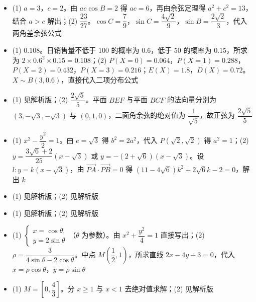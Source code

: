 \begin{itemize}[leftmargin=2.6em]
  \item[\textbf{17.}] (1) $a=3$，$c=2$。由 $ac\cos B=2$ 得 $ac=6$，再由余弦定理得 $a^2+c^2=13$，结合 $a>c$ 解出；(2) $\dfrac{23}{27}$。$\cos C=\dfrac79$，$\sin C=\dfrac{4\sqrt2}9$，$\sin B=\dfrac{2\sqrt2}3$，代入两角差余弦公式
  \item[\textbf{18.}] (1) $0.108$。日销售量不低于 $100$ 的概率为 $0.6$，低于 $50$ 的概率为 $0.15$，所求为 $2\times0.6^2\times0.15=0.108$；(2) $P(X=0)=0.064$，$P(X=1)=0.288$，$P(X=2)=0.432$，$P(X=3)=0.216$；$E(X)=1.8$，$D(X)=0.72$。$X\sim B(3,0.6)$，直接代入二项分布公式
  \item[\textbf{19.}] (1) 见解析版；(2) $\dfrac{2\sqrt5}5$。平面 $BEF$ 与平面 $BCF$ 的法向量分别为 $(3,-\sqrt3,-\sqrt3)$ 与 $(0,1,0)$，二面角余弦的绝对值为 $\dfrac1{\sqrt5}$，故正弦为 $\dfrac{2\sqrt5}5$
  \item[\textbf{20.}] (1) $x^2-\dfrac{y^2}2=1$。由 $e=\sqrt3$ 得 $b^2=2a^2$，代入 $P(\sqrt2,\sqrt2)$ 得 $a^2=1$；(2) $y=\dfrac{3\sqrt6+2}{25}(x-\sqrt3)$ 或 $y=-(2+\sqrt6)(x-\sqrt3)$。设 $l:y=k(x-\sqrt3)$，由 $\overrightarrow{PA}\cdot\overrightarrow{PB}=0$ 得 $(11-4\sqrt6)k^2+2\sqrt6k-2=0$，解出 $k$
  \item[\textbf{21.}] (1) 见解析版；(2) 见解析版
\end{itemize}

\begin{itemize}[leftmargin=2.6em]
  \item[\textbf{22.}] (1) 见解析版；(2) 见解析版
  \item[\textbf{23.}] (1) $\begin{cases}x=\cos\theta,\\y=2\sin\theta\end{cases}$（$\theta$ 为参数）。由 $x^2+\dfrac{y^2}4=1$ 直接写出；(2) $\rho=\dfrac3{4\sin\theta-2\cos\theta}$。中点 $M\left(\dfrac12,1\right)$，所求直线 $2x-4y+3=0$，代入 $x=\rho\cos\theta$，$y=\rho\sin\theta$
  \item[\textbf{24.}] (1) $M=\left[0,\dfrac43\right]$。分 $x\geqslant1$ 与 $x<1$ 去绝对值求解；(2) 见解析版
\end{itemize}
